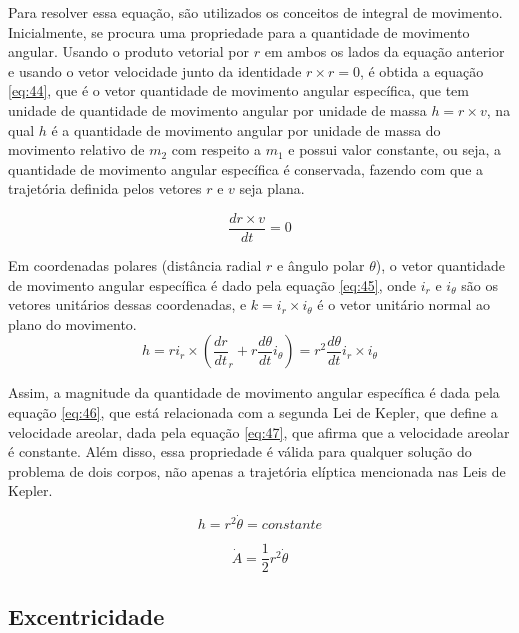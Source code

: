 Para resolver essa equação, são utilizados os conceitos de integral de movimento. Inicialmente, se procura uma propriedade para a quantidade de movimento angular. Usando o produto vetorial por $r$ em ambos os lados da equação anterior e usando o vetor velocidade junto da identidade $r \times r = 0$, é obtida a equação \ref{eq:44}, que é o vetor quantidade de movimento angular específica, que tem unidade de quantidade de movimento angular por unidade de massa $h = r \times v$, na qual $h$ é a quantidade de movimento angular por unidade de massa do movimento relativo de $m_{2}$ com respeito a $m_{1}$ e possui valor constante, ou seja, a quantidade de movimento angular específica é conservada, fazendo com que a trajetória definida pelos vetores $r$ e $v$ seja plana. 

\begin{equation}
    \frac{dr \times v}{dt} = 0
    \label{eq:44}
\end{equation}

Em coordenadas polares (distância radial $r$ e ângulo polar $\theta$), o vetor quantidade de movimento angular específica é dado pela equação \ref{eq:45}, onde $i_r$ e $i_{\theta}$ são os vetores unitários dessas coordenadas, e $k = i_{r} \times i_{\theta}$ é o vetor unitário normal ao plano do movimento. 
\begin{equation}
    h = ri_{r} \times \left( \frac{dr}{dt}_{r} + r\frac{d\theta}{dt}i_{\theta}  \right) = r^{2}\frac{d\theta}{dt}i_{r} \times i_{\theta}
  \label{eq:45}  
\end{equation}

Assim, a magnitude da quantidade de movimento angular específica é dada pela equação \ref{eq:46}, que está relacionada com a segunda Lei de Kepler, que define a velocidade areolar, dada pela equação \ref{eq:47}, que afirma que a velocidade areolar é constante. Além disso, essa propriedade é válida para qualquer solução do problema de dois corpos, não apenas a trajetória elíptica mencionada nas Leis de Kepler.

\begin{equation}
    h = r^{2}\Dot{\theta} = constante
    \label{eq:46}
\end{equation}

\begin{equation}
    \Dot{A} = \frac{1}{2}r^{2}\Dot{\theta}
    \label{eq:47}
\end{equation}

\subsection{Excentricidade}

